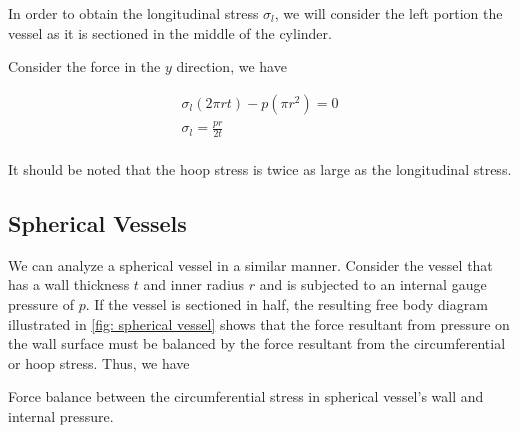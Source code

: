 \documentclass[
10pt,
a4paper,
openany,
svgnames,
]{kaobook} %
\begin{document}
In order to obtain the longitudinal stress $\sigma_l$, we will consider the left portion the vessel as it is sectioned in the middle of the cylinder.

Consider the force in the $y$ direction, we have

\begin{equation}
  \begin{gathered}
    {\sigma _l}(2\pi rt) - p(\pi {r^2}) = 0 \\ 
    {\sigma _l} = \frac{pr}{2t} \\ 
  \end{gathered}
\end{equation}

It should be noted that the hoop stress is twice as large as the longitudinal stress.

\subsection{Spherical Vessels}

We can analyze a spherical vessel in a similar manner. Consider the vessel that has a wall thickness $t$ and inner radius $r$ and is subjected to an internal gauge pressure of $p$. If the vessel is sectioned in half, the resulting free body diagram illustrated in \cref{fig: spherical vessel} shows that the force resultant from pressure on the wall surface must be balanced by the force resultant from the circumferential or hoop stress. Thus, we have

\begin{marginfigure}
  \centering
  \caption{Force balance between the circumferential stress in spherical vessel's wall and internal pressure.}
  \label{fig: spherical vessel}
\end{marginfigure}
\end{document}
